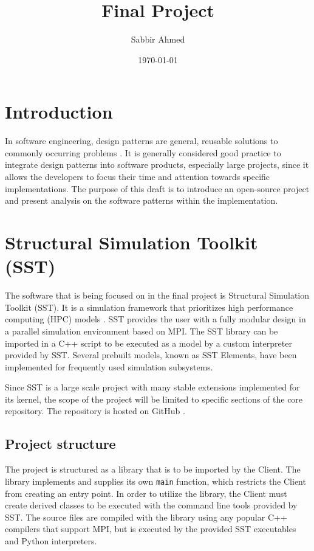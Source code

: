 \documentclass[titlepage]{article}
\title{Final Project}
\author{Sabbir Ahmed}
\date{\today}
\begin{document}
\maketitle

{\hypersetup{hidelinks}
    \tableofcontents
}
\newpage

\section{Introduction}
In software engineering, design patterns are general, reusable solutions to commonly occurring problems \cite{source-making}. It is generally considered good practice to integrate design patterns into software products, especially large projects, since it allows the developers to focus their time and attention towards specific implementations. The purpose of this draft is to introduce an open-source project and present analysis on the software patterns within the implementation.

\section{Structural Simulation Toolkit (SST)}
The software that is being focused on in the final project is Structural Simulation Toolkit (SST). It is a simulation framework that prioritizes high performance computing (HPC) models \cite{sst}. SST provides the user with a fully modular design in a parallel simulation environment based on MPI. The SST library can be imported in a C++ script to be executed as a model by a custom interpreter provided by SST. Several prebuilt models, known as SST Elements, have been implemented for frequently used simulation subsystems.

Since SST is a large scale project with many stable extensions implemented for its kernel, the scope of the project will be limited to specific sections of the core repository. The repository is hosted on GitHub \cite{sst-repo}.

\subsection{Project structure}
The project is structured as a library that is to be imported by the Client. The library implements and supplies its own \texttt{main} function, which restricts the Client from creating an entry point. In order to utilize the library, the Client must create derived classes to be executed with the command line tools provided by SST. The source files are compiled with the library using any popular C++ compilers that support MPI, but is executed by the provided SST executables and Python interpreters.
\end{document}
